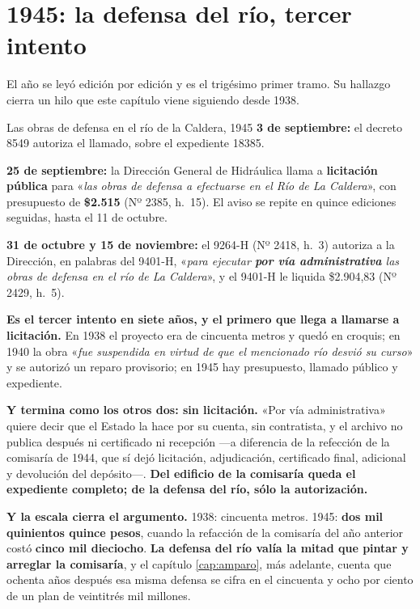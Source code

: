 \section{1945: la defensa del río, tercer intento}

El año se leyó edición por edición y es el trigésimo primer tramo. Su hallazgo
cierra un hilo que este capítulo viene siguiendo desde 1938.

\begin{ficha}{Las obras de defensa en el río de la Caldera, 1945}
\textbf{3 de septiembre:} el decreto 8549 autoriza el llamado, sobre el expediente 18385.

\textbf{25 de septiembre:} la Dirección General de Hidráulica llama a \textbf{licitación
pública} para «\textit{las obras de defensa a efectuarse en el Río de La
Caldera}», con presupuesto de \textbf{\$2.515} (Nº 2385, h.\ 15). El
aviso se repite en quince ediciones seguidas, hasta el 11 de octubre.

\textbf{31 de octubre y 15 de noviembre:} el 9264-H (Nº 2418, h.\ 3) autoriza a la Dirección, en palabras del 9401-H, «\textit{para ejecutar \textbf{por vía
administrativa} las obras de defensa en el río de La Caldera}», y el 9401-H le liquida \$2.904,83 (Nº 2429,
h.\ 5).
\end{ficha}

\begin{cautela}
\textbf{Es el tercer intento en siete años, y el primero que llega a llamarse a
licitación.} En 1938 el proyecto era de cincuenta metros y quedó en croquis; en
1940 la obra «\textit{fue suspendida en virtud de que el mencionado río desvió
su curso}» y se autorizó un reparo provisorio; en 1945 hay presupuesto, llamado
público y expediente.

\textbf{Y termina como los otros dos: sin licitación.} «Por vía administrativa»
quiere decir que el Estado la hace por su cuenta, sin contratista, y el archivo
no publica después ni certificado ni recepción ---a diferencia de la refección
de la comisaría de 1944, que sí dejó licitación, adjudicación, certificado
final, adicional y devolución del depósito---. \textbf{Del edificio de la
comisaría queda el expediente completo; de la defensa del río, sólo la
autorización.}

\textbf{Y la escala cierra el argumento.} 1938: cincuenta metros. 1945:
\textbf{dos mil quinientos quince pesos}, cuando la refacción de la comisaría
del año anterior costó \textbf{cinco mil dieciocho}. \textbf{La defensa del río
valía la mitad que pintar y arreglar la comisaría}, y el capítulo
\ref{cap:amparo}, más adelante, cuenta que ochenta años después esa misma defensa se cifra en
el cincuenta y ocho por ciento de un plan de veintitrés mil millones.
\end{cautela}

